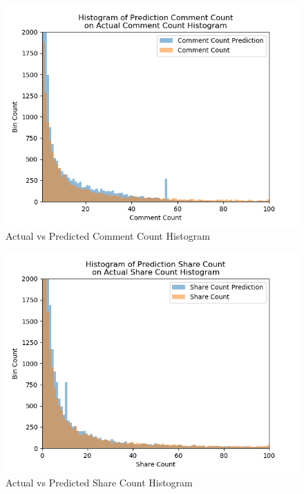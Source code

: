 \documentclass[mksc,blindrev]{informs3} %
\begin{document}
\begin{figure}
\centering
\includegraphics[width=\columnwidth]{images/Comment_Count_Prediction_vs_Actual.png}
\caption{Actual vs Predicted Comment Count Histogram}
\label{comment_count_histogram}
\end{figure}

\begin{figure}
\centering
\includegraphics[width=\columnwidth]{images/Share_Count_Prediction_vs_Actual.png}
\caption{Actual vs Predicted Share Count Histogram}
\label{share_count_histogram}
\end{figure}
\end{document}
